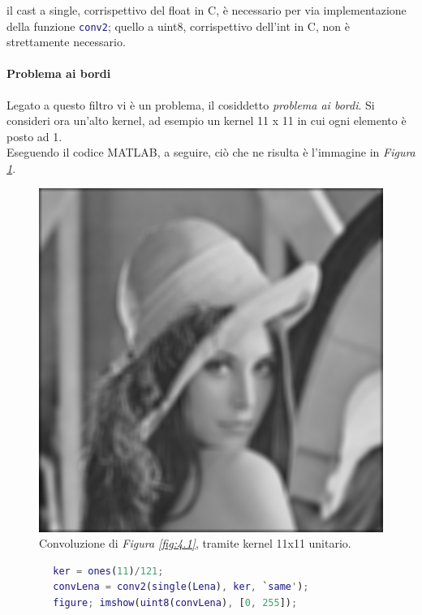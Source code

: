\documentclass{subfiles}
\begin{document}
\begin{Note*}
    il cast a single, corrispettivo del float in C, è necessario per via implementazione della funzione \lstinline[language = MATLAB]{conv2};
    quello a uint8, corrispettivo dell'int in C, non è strettamente necessario.
\end{Note*}
\clearpage

\paragraph{Problema ai bordi}
Legato a questo filtro vi è un problema, il cosiddetto \emph{problema ai bordi}.
Si consideri ora un'alto kernel, ad esempio un kernel 11 x 11 in cui ogni elemento è posto ad 1.\\
Eseguendo il codice MATLAB, a seguire, ciò che ne risulta è l'immagine in \emph{Figura \ref{fig:4.3}}.
\begin{figure}
    \centering
    \includegraphics[scale = 0.275]{../Images/MeanConvolutionLena_11x11.png}
    \caption{Convoluzione di \emph{Figura \ref{fig:4.1}}, tramite kernel 11x11 unitario.}
    \label{fig:4.3}
\end{figure}

\begin{center}
    \begin{lstlisting}[language = MATLAB]
        % si aggiunge l'immagine trascinandola in MATLAB
        ker = ones(11)/121;
        convLena = conv2(single(Lena), ker, `same');
        figure; imshow(uint8(convLena), [0, 255]);
    \end{lstlisting}
\end{center}
\end{document}
